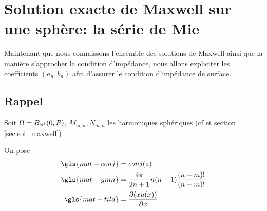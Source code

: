 \section{Solution exacte de Maxwell sur une sphère: la série de Mie}\label{sec:serie_mie}


Maintenant que nous connaissons l'ensemble des solutions de Maxwell ainsi que la manière s'approcher la condition d'impédance, nous allons expliciter les coefficients $(a_n,b_n)$  afin d'assurer le condition d'impédance de surface.


\subsection{Rappel}
Soit $\Omega = B_{\mathbb R^3}(0,R)$, $M_{m,n}, N_{m,n}$ les harmoniques sphériques (cf \cite{marceaux_high-order_2000} et section \ref{sec:sol_maxwell})


On pose
\begin{align*}
  \gls{mat-conj} &=conj(z)\\
  \gls{mat-gmn} &=\frac{4\pi}{2n+1}n(n+1)\frac{(n+m)!}{(n-m)!}\\
  \gls{mat-tild} &= \dr{x}{(xu(x))}
\end{align*}


